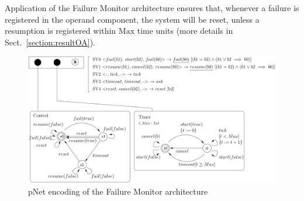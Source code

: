 \documentclass[smallcondensed]{svjour3}
\newcommand{\mdash}{---}
\begin{document}

%


Application of the Failure Monitor architecture ensures that, whenever
a failure is registered in the operand component, the system will be
reset, unless a resumption is registered within $\mathrm{Max}$ time
units (more details in Sect.~\ref{section:resultOA}).

\begin{figure}[t]
  \centering
  \includegraphics[width=0.9\columnwidth]{ActaXFIG/FailureTimerPNET-v2-2}
  \caption{pNet encoding of the Failure Monitor architecture}
  \label{schema:ArchFailure:pNet}
\end{figure}
\end{document}
